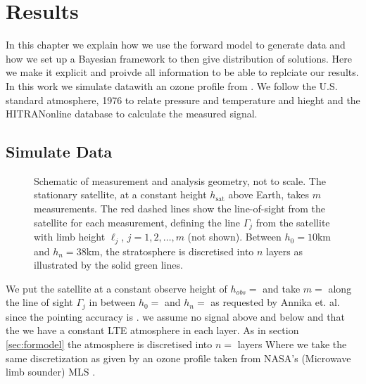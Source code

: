 \chapter{Results}
\label{ch:res}

In this chapter we explain how we use the forward model to generate data and how we set up a Bayesian framework to then give distribution of solutions.
Here we make it explicit and proivde all information to be able to replciate our results.
In this work we simulate datawith an ozone profile from \cite{}.
We follow the U.S. standard atmosphere, 1976 \cite{} to relate pressure and temperature and hieght and the HITRANonline \cite{} database to calculate the measured signal.\expandafter\string\the\font 

\section{Simulate Data}
\begin{figure}[ht!]
	\centering
	
	\label{fig:LIMB}
	\caption{Schematic of measurement and analysis geometry, not to scale.
		The stationary satellite, at a constant height $h_\text{sat}$ above  Earth, takes $m$ measurements.
		The red dashed lines show the line-of-sight from the satellite for each measurement, defining the line $\Gamma_j$ from the satellite with limb height $\ell_j$, $j=1,2,\dots,m$ (not shown).
		Between $h_0 = 10$km and $h_{n} = 38$km, the stratosphere is discretised into $n$ layers as illustrated by the solid green lines.}
\end{figure}
We put the satellite at a constant observe height of $h_{obs} =$ and take $m = $ along the line of sight $\Gamma_j$ in between $h_0= $ and $h_n = $ as requested by Annika et. al. since the pointing accuracy is .
we assume no signal above and below and that the we have a constant LTE atmosphere in each layer.
As in section \ref{sec:formodel} the atmosphere is discretised into $n = $ layers
Where we take the same discretization as given by an ozone profile taken from NASA's (Microwave limb sounder) MLS \cite{}.



